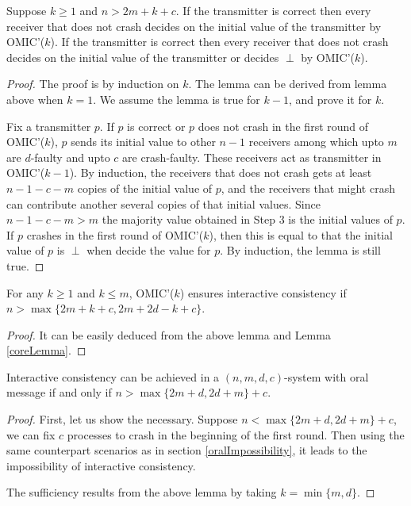 \begin{lemma}
  Suppose $k \geqslant 1$ and $n>2m+k+c$. If the transmitter is correct then
  every receiver that does not crash decides on the initial value of the
  transmitter by OMIC'($k$). If the transmitter is correct then every receiver
  that does not crash decides on the initial value of the transmitter or
  decides $\perp$ by OMIC'($k$).
\end{lemma}

\begin{proof}
  The proof is by induction on $k$. The lemma can be derived from lemma above
  when $k=1$. We assume the lemma is true for $k-1$, and prove it for $k$.
  
  Fix a transmitter $p$. If $p$ is correct or $p$ does not crash in the first
  round of OMIC'($k$), $p$ sends its initial value to other $n-1$ receivers
  among which upto $m$ are $d$-faulty and upto $c$ are crash-faulty. These
  receivers act as transmitter in OMIC'($k-1$). By induction, the
  receivers that does not crash gets at least $n-1-c-m$ copies of the initial
  value of $p$, and the receivers that might crash can contribute another
  several copies of that initial values. Since $n-1-c-m>m$ the majority value
  obtained in Step $3$ is the initial values of $p$. If $p$ crashes in the
  first round of OMIC'($k$), then this is equal to that the initial value of
  $p$ is $\perp$ when decide the value for $p$. By induction, the lemma is
  still true.
\end{proof}

\begin{lemma}
  For any $k \geqslant 1$ and $k \leqslant m$, OMIC'($k$) ensures interactive
  consistency if $n> \max \{ 2m+k+c,2m+2d-k+c \}$.
\end{lemma}

\begin{proof}
  It can be easily deduced from the above lemma and Lemma \ref{coreLemma}.
\end{proof}

\begin{theorem}
  Interactive consistency can be achieved in a $( n,m,d,c )$-system with oral
  message if and only if $n> \max \{ 2m+d,2d+m \} +c$.
\end{theorem}

\begin{proof}
  First, let us show the necessary. Suppose $n< \max \{ 2m+d,2d+m \} +c$, we
  can fix $c$ processes to crash in the beginning of the first round. Then
  using the same counterpart scenarios as in section \ref{oralImpossibility}, it leads to the
  impossibility of interactive consistency.
  
  The sufficiency results from the above lemma by taking $k= \min \{ m,d \}$.
\end{proof}
\fi
